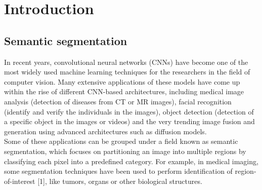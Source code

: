  
\chapter{Introduction}
 
\section{Semantic segmentation}
In recent years, convolutional neural networks (CNNs) have become one of the most widely used machine learning techniques for the researchers in the field of computer vision. Many extensive applications of these models have come up within the rise of different CNN-based architectures, including medical image analysis (detection of diseases from CT or MR images), facial recognition (identify and verify the individuals in the images), object detection (detection of a specific object in the images or videos) and the very trending image fusion and generation using advanced architectures such as diffusion models.\\ 

Some of these applications can be grouped under a field known as semantic segmentation, which focuses on partitioning an image into multiple regions by classifying each pixel into a predefined category. For example, in medical imaging, some segmentation techniques have been used to perform identification of region-of-interest [1], like tumors, organs or other biological structures.\\ 

